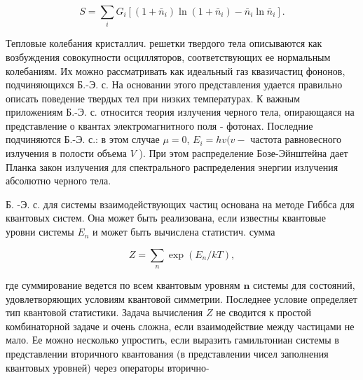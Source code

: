 \documentclass[10pt]{article}
\begin{document}
\[

S=\sum_{i} G_{i}\left[\left(1+\bar{n}_{i}\right) \ln \left(1+\bar{n}_{i}\right)-\bar{n}_{i} \ln \bar{n}_{i}\right] .

\]



Тепловые колебания кристаллич. решетки твердого тела описываются как возбуждения совокупности осцилляторов, соответствующих ее нормальным колебаниям. Их можно рассматривать как идеальный газ квазичастиц фононов, подчиняющихся Б.-Э. с. На основании этого представления удается правильно описать поведение твердых тел при низких температурах. К важным приложениям Б.-Э. с. относится теория излучения черного тела, опирающаяся на представление о квантах электромагнитного поля - фотонах. Последние подчиняются Б.-Э. с.: в этом случае $\mu=0$, $E_{i}=h v(v-$ частота равновесного излучения в полости объема $V$ ). При этом распределение Бозе-Эйнштейна дает Планка закон излучения для спектрального распределения энергии излучения абсолютно черного тела.



Б. -Э. с. для системы взаимодействующих частиц основана на методе Гиббса для квантовых систем. Она может быть реализована, если известны квантовые уровни системы $E_{n}$ и может быть вычислена статистич. сумма



\[

Z=\sum_{n} \exp \left(E_{n} / k T\right),

\]



где суммирование ведется по всем квантовым уровням $\boldsymbol{n}$ системы для состояний, удовлетворяющих условиям квантовой симметрии. Последнее условие определяет тип квантовой статистики. Задача вычисления $Z$ не сводится к простой комбинаторной задаче и очень сложна, если взаимодействие между частицами не мало. Ее можно несколько упростить, если выразить гамильтониан системы в представлении вторичного квантования (в представлении чисел заполнения квантовых уровней) через операторы вторично-
\end{document}
